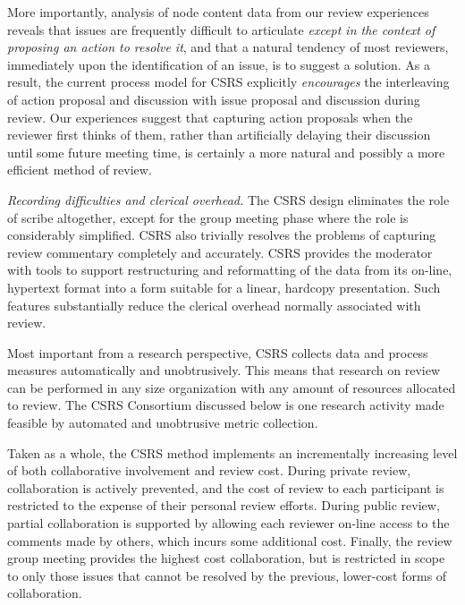 \begin{itemizenoindent}
  More importantly, analysis of node content data from our review
  experiences reveals that issues are frequently difficult to articulate
  {\em except in the context of proposing an action to resolve it}, and
  that a natural tendency of most reviewers, immediately upon the
  identification of an issue, is to suggest a solution.  As a result, the
  current process model for CSRS explicitly {\em encourages} the
  interleaving of action proposal and discussion with issue proposal and
  discussion during review.  Our experiences suggest that capturing action
  proposals when the reviewer first thinks of them, rather than
  artificially delaying their discussion until some future meeting time, is
  certainly a more natural and possibly a more efficient method of review.
  
\item {\em Recording difficulties and clerical overhead.} The CSRS design
  eliminates the role of scribe altogether, except for the group meeting
  phase where the role is considerably simplified.  CSRS also trivially
  resolves the problems of capturing review commentary completely and
  accurately.  CSRS provides the moderator with tools to support
  restructuring and reformatting of the data from its on-line, hypertext
  format into a form suitable for a linear, hardcopy presentation.  Such
  features substantially reduce the clerical overhead normally associated
  with review.
 
  Most important from a research perspective, CSRS collects data and
  process measures automatically and unobtrusively.  This means that
  research on review can be performed in any size organization with any
  amount of resources allocated to review.  The CSRS Consortium discussed
  below is one research activity made feasible by automated and
  unobtrusive metric collection.

\end{itemizenoindent}

Taken as a whole, the CSRS method implements an incrementally increasing
level of both collaborative involvement and review cost.  During private
review, collaboration is actively prevented, and the cost of review to each
participant is restricted to the expense of their personal review efforts.
During public review, partial collaboration is supported by allowing each
reviewer on-line access to the comments made by others, which incurs some
additional cost.  Finally, the review group meeting provides the highest
cost collaboration, but is restricted in scope to only those issues that
cannot be resolved by the previous, lower-cost forms of collaboration.

